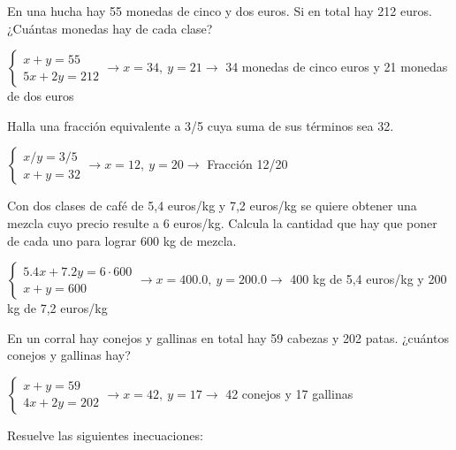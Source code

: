 \documentclass[spanish, 11pt]{exam}
\begin{document}
\begin{questions}
\question En una hucha hay 55 monedas de cinco y dos euros. Si en total hay 212 euros. ¿Cuántas monedas hay de cada clase?
\begin{solution} $\left\{\begin{matrix}x+y=55 \\ 5x+2y=212\end{matrix}\right. \to  x = 34, \  y = 21 \to$ 34 monedas de cinco euros y 21 monedas de dos euros \end{solution}

\question Halla una fracción equivalente a 3/5 cuya suma de sus términos sea 32.
\begin{solution} $\left\{\begin{matrix}x/y=3/5 \\ x+y=32\end{matrix}\right. \to  x = 12, \  y = 20 \to$ Fracción 12/20 \end{solution}

\question Con dos clases de café de 5,4 euros/kg y 7,2 euros/kg se quiere obtener una mezcla cuyo precio resulte a 6 euros/kg. Calcula la cantidad que hay que poner de cada uno para lograr 600 kg de mezcla.

\begin{solution} $\left\{\begin{matrix}5.4x+7.2y=6 \cdot 600 \\ x+y=600\end{matrix}\right. \to  x = 400.0, \  y = 200.0 \to$ 400 kg de 5,4 euros/kg y 200 kg de 7,2 euros/kg \end{solution}

\question En un corral hay conejos y gallinas en total hay 59 cabezas y 202 patas. ¿cuántos conejos y gallinas hay?
\begin{solution} $\left\{\begin{matrix}x+y=59 \\ 4x+2y=202\end{matrix}\right. \to  x = 42, \  y = 17 \to$ 42 conejos y 17 gallinas \end{solution}

    
    \question Resuelve las siguientes inecuaciones:
        \begin{multicols}{2} 
\end{multicols}
\end{questions}
\end{document}
